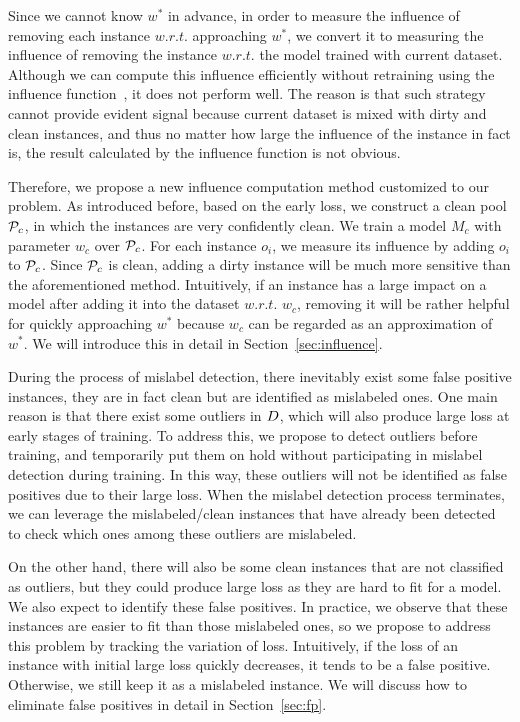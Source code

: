 Since we cannot know  $w^*$ in advance, in order to measure the influence of removing each instance $w.r.t.$ approaching  $w^*$, we  convert it to  measuring the influence of removing the instance $w.r.t.$ the model trained with current dataset. Although we can compute this influence efficiently without retraining using the influence function~\cite{}, it does not perform well. The reason is that  such strategy cannot provide evident signal because current dataset is mixed with dirty and clean instances, and thus no matter how large the influence of the instance in fact is, the  result  calculated by the influence function is not obvious.

Therefore, we propose a new influence computation method customized to our problem. As introduced before, based on the early loss,  we construct a clean pool $\mathcal{P}_c$, in which the instances are very confidently clean. We train a model $M_c$ with parameter $w_c$ over $\mathcal{P}_c$. For each instance $o_i$, we measure its influence by adding $o_i$ to $\mathcal{P}_c$. Since $\mathcal{P}_c$ is clean, adding a dirty instance will be much more sensitive than the aforementioned method.
Intuitively, if an instance has a large impact on a model after adding it into the dataset  $w.r.t.$  $w_c$, removing it will be rather helpful  for   quickly  approaching $w^*$ because $w_c$ can be regarded as an approximation of $w^*$. We will introduce this in detail in Section~\ref{sec:influence}.




 During the process of mislabel detection, there inevitably exist some false positive instances, \ie  they are in fact clean but are identified as mislabeled ones. One main reason is that there exist some outliers in $D$, which will also produce large loss at early stages of training. To address this, we propose to detect outliers before training, and temporarily put them on hold without participating in mislabel detection during training. In this way, these outliers will not be identified as false positives due to their large loss. When the mislabel detection process terminates, we can leverage the mislabeled/clean instances that have already been detected to check which ones among these outliers are mislabeled.

On the other hand, there will also be some clean instances that are not classified as outliers, but they could produce large loss as they are hard to fit for a model. We also expect to identify these false positives. In practice, we observe that these instances are easier to fit than those mislabeled ones, so we propose to address this problem by tracking the variation of loss. Intuitively, if the loss  of an instance with initial large loss quickly decreases, it tends to be a false positive. Otherwise, we still keep it as a mislabeled instance. We will discuss how to eliminate false positives in detail in Section~\ref{sec:fp}.


